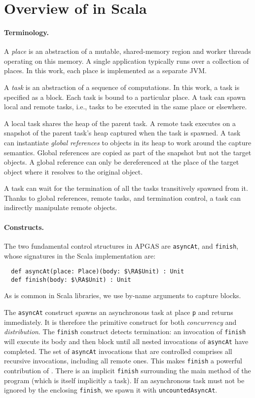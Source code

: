 \section{Overview of \apgas in Scala}
\label{sec:apgas}

\paragraph{Terminology.}
A {\em place} is an abstraction of a mutable, shared-memory region and worker threads operating on this memory.
A single application typically runs over a collection of places. In this work, each place is implemented as a separate JVM.

A {\em task} is an abstraction of a sequence of computations. In this work, a task is specified as a block.
Each task is bound to a particular place. 
A task can spawn local and remote tasks, i.e., tasks to be executed in the same place or elsewhere.

A local task shares the heap of the parent task. A remote task executes on a snapshot of the parent task's heap captured when the task is spawned. A task can instantiate \emph{global references} to objects in its heap to work around the capture semantics.
Global references are copied as part of the snapshot but not the target objects. A global reference can only be dereferenced
at the place of the target object where it resolves to the original object.

A task can wait for the termination of all the tasks transitively spawned from it.
Thanks to global references, remote tasks, and termination control,
a task can indirectly manipulate remote objects.

\paragraph{Constructs.}
The two fundamental control structures in APGAS are
 \lstinline{asyncAt}, and \lstinline{finish}, whose signatures in
the Scala implementation are:
\begin{lstlisting}
  def asyncAt(place: Place)(body: $\RA$Unit) : Unit
  def finish(body: $\RA$Unit) : Unit
\end{lstlisting}
As is common in Scala libraries, we use by-name arguments to capture blocks.

The \lstinline{asyncAt} construct spawns an asynchronous task at place \lstinline{p} and returns
immediately. It is therefore the primitive construct for both \emph{concurrency} and \emph{distribution}.
The \lstinline{finish} construct detects termination: an invocation of
\lstinline{finish} will execute its body and then block until all nested invocations
of \lstinline{asyncAt} have completed. The set of \lstinline{asyncAt} invocations
that are controlled comprises all recursive invocations, including all remote
ones. This makes \lstinline{finish} a powerful contribution of \apgas.
There is an implicit \lstinline{finish} surrounding the main method of the program (which is itself implicitly a task).
If an asynchronous task must not be ignored by the enclosing \lstinline{finish}, we spawn it with \lstinline{uncountedAsyncAt}.

